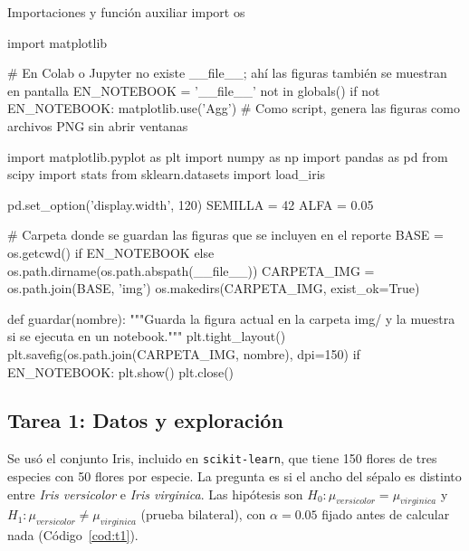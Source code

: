 \documentclass[11pt,letterpaper]{article}
\begin{document}
\begin{codigo}[label=cod:comun]{Importaciones y función auxiliar}
import os

import matplotlib

# En Colab o Jupyter no existe __file__; ahí las figuras también se muestran en pantalla
EN_NOTEBOOK = '__file__' not in globals()
if not EN_NOTEBOOK:
    matplotlib.use('Agg')  # Como script, genera las figuras como archivos PNG sin abrir ventanas

import matplotlib.pyplot as plt
import numpy as np
import pandas as pd
from scipy import stats
from sklearn.datasets import load_iris

pd.set_option('display.width', 120)
SEMILLA = 42
ALFA = 0.05

# Carpeta donde se guardan las figuras que se incluyen en el reporte
BASE = os.getcwd() if EN_NOTEBOOK else os.path.dirname(os.path.abspath(__file__))
CARPETA_IMG = os.path.join(BASE, 'img')
os.makedirs(CARPETA_IMG, exist_ok=True)


def guardar(nombre):
    """Guarda la figura actual en la carpeta img/ y la muestra si se ejecuta en un notebook."""
    plt.tight_layout()
    plt.savefig(os.path.join(CARPETA_IMG, nombre), dpi=150)
    if EN_NOTEBOOK:
        plt.show()
    plt.close()
\end{codigo}

\subsection{Tarea 1: Datos y exploración}

Se usó el conjunto Iris, incluido en \texttt{scikit-learn}, que tiene 150 flores de tres especies con 50 flores por especie. La pregunta es si el ancho del sépalo es distinto entre \textit{Iris versicolor} e \textit{Iris virginica}. Las hipótesis son $H_0\colon \mu_{versicolor} = \mu_{virginica}$ y $H_1\colon \mu_{versicolor} \ne \mu_{virginica}$ (prueba bilateral), con $\alpha = 0.05$ fijado antes de calcular nada (Código~\ref{cod:t1}).
\end{document}
